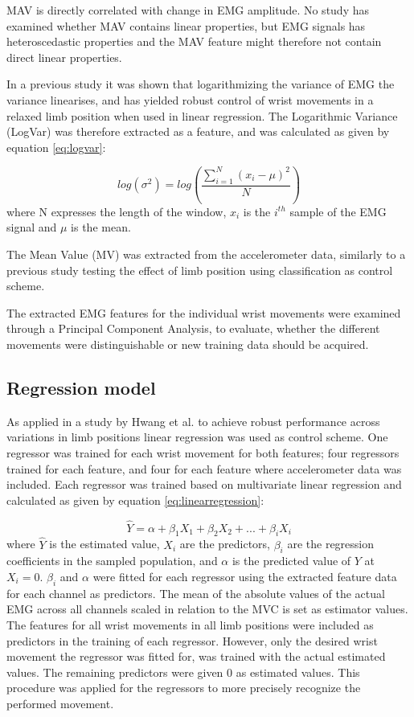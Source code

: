 \begin{multicols}{2}
MAV is directly correlated with change in EMG amplitude. No study has examined whether MAV contains linear properties, but EMG signals has heteroscedastic properties \cite{rasool2012} and the MAV feature might therefore not contain direct linear properties.

In a previous study \cite{hahne2014} it was shown that logarithmizing the variance of EMG the variance linearises, and has yielded robust control of wrist movements in a relaxed limb position when used in linear regression. The Logarithmic Variance (LogVar) was therefore extracted as a feature, and was calculated as given by equation \ref{eq:logvar}:

\begin{equation} \label{eq:logvar}
log(\sigma^2) = log(\frac{\sum\limits_{i=1}^N(x_i - \mu)^2}{N})
\end{equation}
where N expresses the length of the window, $x_i$ is the $i^{th}$ sample of the EMG signal and $\mu$ is the mean.

The Mean Value (MV) was extracted from the accelerometer data, similarly to a previous study \cite{Krasoulis2015} testing the effect of limb position using classification as control scheme. 

The extracted EMG features for the individual wrist movements were examined through a Principal Component Analysis, to evaluate, whether the different movements were distinguishable or new training data should be acquired.

\subsection*{Regression model}
As applied in a study by Hwang et al. \cite{hwang2017} to achieve robust performance across variations in limb positions linear regression was used as control scheme. One regressor was trained for each wrist movement for both features; four regressors trained for each feature, and four for each feature where accelerometer data was included. Each regressor was trained based on multivariate linear regression and calculated as given by equation \ref{eq:linearregression}:

\begin{equation} \label{eq:linearregression}
\hat{Y} = \alpha + \beta_1 X_{1} + \beta_2 X_{2} + ... + \beta_i X_{i}
\end{equation}
where $\hat{Y}$ is the estimated value, $X_i$ are the predictors, $\beta_i$ are the regression coefficients in the sampled population, and $\alpha$ is the predicted value of $Y$ at $X_{i} = 0$. $\beta_i$ and $\alpha$ were fitted for each regressor using the extracted feature data for each channel as predictors. The mean of the absolute values of the actual EMG across all channels scaled in relation to the MVC is set as estimator values. The features for all wrist movements in all limb positions were included as predictors in the training of each regressor. However, only the desired wrist movement the regressor was fitted for, was trained with the actual estimated values. The remaining predictors were given 0 as estimated values. This procedure was applied for the regressors to more precisely recognize the performed movement.


\end{multicols}
